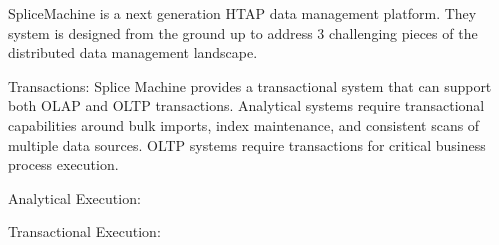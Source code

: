 SpliceMachine is a next generation HTAP data management platform.  They system is designed from the ground up to address 3 challenging pieces of the distributed data management landscape.

Transactions: Splice Machine provides a transactional system that can support both OLAP and OLTP transactions.  Analytical systems require transactional capabilities around bulk imports, index maintenance, and consistent scans of multiple data sources.  OLTP systems require transactions for critical business process execution.

Analytical Execution:

Transactional Execution:



